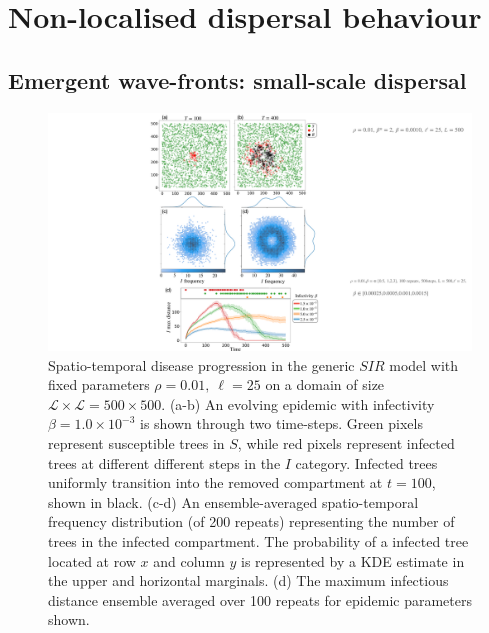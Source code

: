 \newpage
\section{Non-localised dispersal behaviour}

\blindtext


\subsection{Emergent wave-fronts: small-scale dispersal}
\blindtext

\begin{figure}
    \centering
    \includegraphics[scale=0.52]{chapter5/figures/fig1-sir-spatio-temporal.pdf}
    \caption{Spatio-temporal disease progression in the generic $SIR$ model with fixed parameters $\rho=0.01,\ \ell = 25$ on a domain of size $\mathcal{L} \times \mathcal{L} = 500 \times 500$. (a-b) An evolving epidemic with infectivity $\beta=1.0\times 10^{-3}$ is shown through two time-steps. Green pixels represent susceptible trees in $S$, while red pixels represent infected trees at different different steps in the $I$ category. Infected trees uniformly transition into the removed compartment at $t=100$, shown in black. (c-d) An ensemble-averaged spatio-temporal frequency distribution (of 200 repeats) representing the number of trees in the infected compartment. The probability of a infected tree located at row $x$ and column $y$ is represented by a KDE estimate in the upper and horizontal marginals. (d) The maximum infectious distance ensemble averaged over 100 repeats for epidemic parameters shown.}
\label{fig:sgm-evol}
\end{figure}


